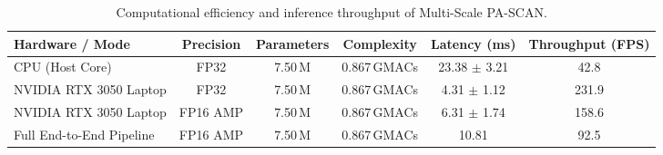 \begin{table}[htbp]
\centering
\caption{Computational efficiency and inference throughput of Multi-Scale PA-SCAN.}
\label{tab:efficiency_benchmark}
\begin{tabular}{lccccc}
\hline
\textbf{Hardware / Mode} & \textbf{Precision} & \textbf{Parameters} & \textbf{Complexity} & \textbf{Latency (ms)} & \textbf{Throughput (FPS)} \\
\hline
CPU (Host Core)           & FP32 & 7.50\,M & 0.867\,GMACs & 23.38 $\pm$ 3.21 & 42.8 \\
NVIDIA RTX 3050 Laptop    & FP32 & 7.50\,M & 0.867\,GMACs & 4.31 $\pm$ 1.12 & 231.9 \\
NVIDIA RTX 3050 Laptop    & FP16 AMP & 7.50\,M & 0.867\,GMACs & 6.31 $\pm$ 1.74 & 158.6 \\
Full End-to-End Pipeline  & FP16 AMP & 7.50\,M & 0.867\,GMACs & 10.81 & 92.5 \\
\hline
\end{tabular}
\end{table}
